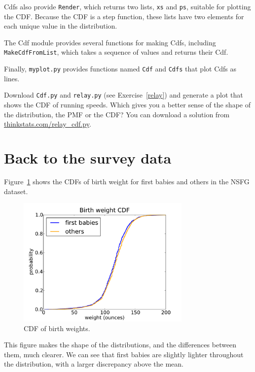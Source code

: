 \documentclass[12pt]{book}
\begin{document}
Cdfs also provide {\tt Render}, which returns two lists, {\tt xs} and
{\tt ps}, suitable for plotting the CDF.  Because the CDF is a
step function, these lists have two elements for each unique
value in the distribution.

The Cdf module provides several functions for making Cdfs, including
{\tt MakeCdfFromList}, which takes a sequence of values
and returns their Cdf.

Finally, {\tt myplot.py} provides functions named {\tt Cdf} and
{\tt Cdfs} that plot Cdfs as lines.

\begin{exercise}
Download {\tt Cdf.py} and \verb"relay.py" (see
Exercise~\ref{relay}) and generate a plot that shows the CDF of
running speeds.  Which gives you a better sense of the shape of the
distribution, the PMF or the CDF?  You can download a solution
from \url{thinkstats.com/relay_cdf.py}.

\end{exercise}


\section{Back to the survey data}
\label{birth_weights}

Figure~\ref{nsfg_birthwgt_cdf} shows the CDFs of birth weight for
first babies and others in the NSFG dataset.

\begin{figure}
\centerline{\includegraphics[height=2.5in]{figs/nsfg_birthwgt_cdf.pdf}}
\caption{CDF of birth weights.}
\label{nsfg_birthwgt_cdf}
\end{figure}

This figure makes the shape of the distributions, and the differences
between them, much clearer.  We can see that first babies are slightly
lighter throughout the distribution, with a larger discrepancy above 
the mean.
\end{document}
